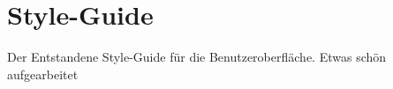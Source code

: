 \chapter{Style-Guide}\label{app:style-guide}
Der Entstandene Style-Guide für die Benutzeroberfläche. Etwas schön aufgearbeitet